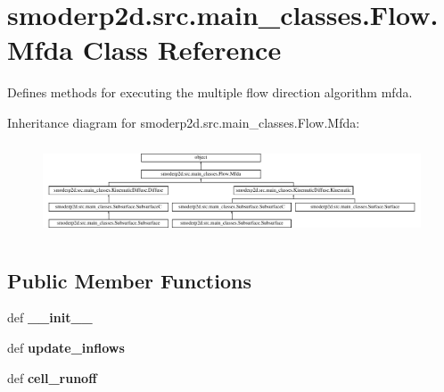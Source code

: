 \hypertarget{classsmoderp2d_1_1src_1_1main__classes_1_1Flow_1_1Mfda}{\section{smoderp2d.\-src.\-main\-\_\-classes.\-Flow.\-Mfda Class Reference}
\label{classsmoderp2d_1_1src_1_1main__classes_1_1Flow_1_1Mfda}
}


Defines methods for executing the multiple flow direction algorithm mfda.  


Inheritance diagram for smoderp2d.\-src.\-main\-\_\-classes.\-Flow.\-Mfda\-:\begin{figure}[H]
\begin{center}
\leavevmode
\includegraphics[height=2.753196cm]{d0/df4/classsmoderp2d_1_1src_1_1main__classes_1_1Flow_1_1Mfda}
\end{center}
\end{figure}
\subsection*{Public Member Functions}
\begin{DoxyCompactItemize}
\item 
\hypertarget{classsmoderp2d_1_1src_1_1main__classes_1_1Flow_1_1Mfda_ad82acdf6efe4e833d848dc65703b4bc8}{def {\bfseries \-\_\-\-\_\-init\-\_\-\-\_\-}}\label{classsmoderp2d_1_1src_1_1main__classes_1_1Flow_1_1Mfda_ad82acdf6efe4e833d848dc65703b4bc8}

\item 
\hypertarget{classsmoderp2d_1_1src_1_1main__classes_1_1Flow_1_1Mfda_aa15202947e215f0d25bbfb8b92864362}{def {\bfseries update\-\_\-inflows}}\label{classsmoderp2d_1_1src_1_1main__classes_1_1Flow_1_1Mfda_aa15202947e215f0d25bbfb8b92864362}

\item 
\hypertarget{classsmoderp2d_1_1src_1_1main__classes_1_1Flow_1_1Mfda_a10002cd66762a4b9a02e71d91a36cc57}{def {\bfseries cell\-\_\-runoff}}\label{classsmoderp2d_1_1src_1_1main__classes_1_1Flow_1_1Mfda_a10002cd66762a4b9a02e71d91a36cc57}

\end{DoxyCompactItemize}
